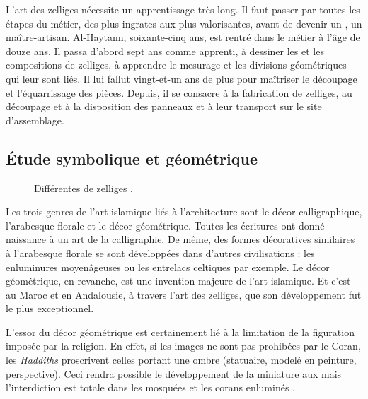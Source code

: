 L'art des zelliges nécessite un apprentissage très long. Il faut 
passer par toutes les étapes du métier, des plus ingrates aux plus 
valorisantes, avant de devenir un \maallem, un maître-artisan. 
Al-Haytam\={\i}, soixante-cinq ans, est rentré dans le métier à 
l'âge de douze ans. Il passa d'abord sept ans comme apprenti, à 
dessiner les \furmas et les compositions de zelliges, à apprendre 
le mesurage et les divisions géométriques qui leur sont liés. Il 
lui fallut vingt-et-un ans de plus pour maîtriser le découpage et 
l'équarrissage des pièces. Depuis, il se consacre à la fabrication 
de zelliges, au découpage et à la disposition des panneaux et à leur 
transport sur le site d'assemblage.

\subsection{Étude symbolique et géométrique}

\begin{figure}[hbt]
  \caption{Différentes \furmas de zelliges \autocite{Castera_1996}.}
  \label{fig:furmas}
\end{figure}

Les trois genres de l'art islamique liés à l'architecture sont le 
décor calligraphique, l'arabesque florale et le décor géométrique. 
Toutes les écritures ont donné naissance à un art de la calligraphie. 
De même, des formes décoratives similaires à l'arabesque florale se 
sont développées dans d'autres civilisations : les enluminures 
moyenâgeuses ou les entrelacs celtiques par exemple. Le décor 
géométrique, en revanche, est une invention majeure de l'art 
islamique. Et c'est au Maroc et en Andalousie, à travers l'art des 
zelliges, que son développement fut le plus exceptionnel.

L'essor du décor géométrique est certainement lié à la limitation de 
la figuration imposée par la religion. En effet, si les images ne sont 
pas prohibées par le Coran, les \emph{Haddiths}  proscrivent celles portant une 
ombre (statuaire, modelé en peinture, perspective). Ceci rendra 
possible le développement de la miniature aux  
mais l'interdiction est totale dans les mosquées et les corans 
enluminés \autocite{Castera_1996}.

